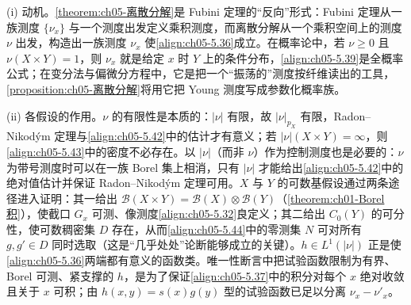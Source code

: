 \documentclass[../../main.tex]{subfiles}%
\begin{document}
\begin{remark}\label{remark:ch05-离散分解动机}
(i) 动机。\cref{theorem:ch05-离散分解}是 Fubini 定理的“反向”形式：Fubini 定理从一族测度 $\{\nu_x\}$ 与一个测度出发定义乘积测度，而离散分解从一个乘积空间上的测度 $\nu$ 出发，构造出一族测度 $\nu_x$ 使\eqref{align:ch05-5.36}成立。在概率论中，若 $\nu\geqslant0$ 且 $\nu(X\times Y)=1$，则 $\nu_x$ 就是给定 $x$ 时 $Y$ 上的条件分布，\eqref{align:ch05-5.39}是全概率公式；在变分法与偏微分方程中，它是把一个“振荡的”测度按纤维读出的工具，\cref{proposition:ch05-离散分解}将用它把 Young 测度写成参数化概率族。

(ii) 各假设的作用。$\nu$ 的有限性是本质的：$|\nu|$ 有限，故 $|\nu|_{p_X}$ 有限，Radon--Nikodým 定理与\eqref{align:ch05-5.42}中的估计才有意义；若 $|\nu|(X\times Y)=\infty$，则\eqref{align:ch05-5.43}中的密度不必存在。以 $|\nu|$（而非 $\nu$）作为控制测度也是必要的：$\nu$ 为带号测度时可以在一族 Borel 集上相消，只有 $|\nu|$ 才能给出\eqref{align:ch05-5.42}中的绝对值估计并保证 Radon--Nikodým 定理可用。$X$ 与 $Y$ 的可数基假设通过两条途径进入证明：其一给出 $\mathscr{B}(X\times Y)=\mathscr{B}(X)\otimes\mathscr{B}(Y)$（\cref{theorem:ch01-Borel积}），使截口 $G_x$ 可测、像测度\eqref{align:ch05-5.32}良定义；其二给出 $C_0(Y)$ 的可分性，使可数稠密集 $D$ 存在，从而\eqref{align:ch05-5.44}中的零测集 $N$ 可对所有 $g,g'\in D$ 同时选取（这是“几乎处处”论断能够成立的关键）。$h\in L^1(|\nu|)$ 正是使\eqref{align:ch05-5.36}两端都有意义的函数类。唯一性断言中把试验函数限制为有界、Borel 可测、紧支撑的 $h$，是为了保证\eqref{align:ch05-5.37}中的积分对每个 $x$ 绝对收敛且关于 $x$ 可积；由 $h(x,y)=s(x)g(y)$ 型的试验函数已足以分离 $\nu_x-\nu'_x$。


\end{remark}
\end{document}
